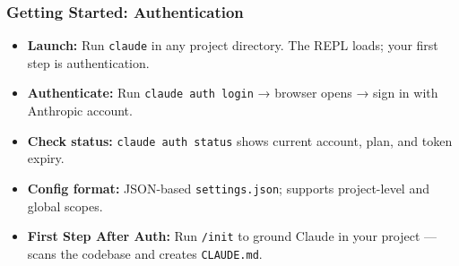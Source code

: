 \begin{frame}[fragile]\frametitle{Getting Started: Authentication}

  \begin{itemize}
    \item \textbf{Launch:} Run \texttt{claude} in any project directory. The REPL loads; your first step is authentication.
    \item \textbf{Authenticate:} Run \texttt{claude auth login} → browser opens → sign in with Anthropic account.
    \item \textbf{Check status:} \texttt{claude auth status} shows current account, plan, and token expiry.
    \item \textbf{Config format:} JSON-based \texttt{settings.json}; supports project-level and global scopes.
    \item \textbf{First Step After Auth:} Run \texttt{/init} to ground Claude in your project --- scans the codebase and creates \texttt{CLAUDE.md}.
  \end{itemize}

\end{frame}

